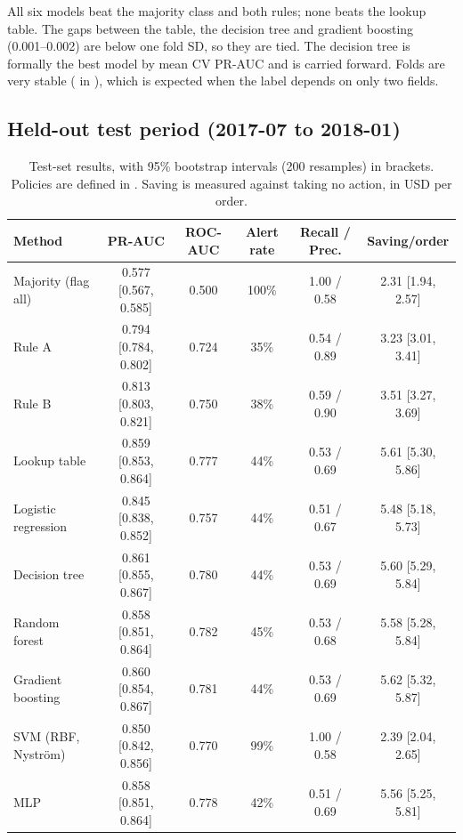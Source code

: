All six models beat the majority class and both rules; none beats the lookup table. The gaps
between the table, the decision tree and gradient boosting (0.001--0.002) are below one fold
SD, so they are tied. The decision tree is formally the best model by mean CV PR-AUC and is
carried forward. Folds are very stable ( in ), which is expected when the label depends on only two
fields.


\subsection{Held-out test period (2017-07 to 2018-01)}
\begin{table}[!htbp]
  \centering
  \caption{Test-set results, with 95\% bootstrap intervals (200 resamples) in brackets. Policies are defined in . Saving is measured against taking no action, in USD per order.}
  \label{tab:test}
  \footnotesize
  \setlength{\tabcolsep}{2.5pt}
  \begin{tabular}{l c c c c c}
    \toprule
    \textbf{Method} & \textbf{PR-AUC} & \textbf{ROC-AUC} & \textbf{Alert rate} & \textbf{Recall / Prec.} & \textbf{Saving/order} \\
    \midrule
    Majority (flag all)  & 0.577 [0.567, 0.585] & 0.500 & 100\% & 1.00 / 0.58 & 2.31 [1.94, 2.57] \\
    Rule A               & 0.794 [0.784, 0.802] & 0.724 & 35\%  & 0.54 / 0.89 & 3.23 [3.01, 3.41] \\
    Rule B               & 0.813 [0.803, 0.821] & 0.750 & 38\%  & 0.59 / 0.90 & 3.51 [3.27, 3.69] \\
    Lookup table         & 0.859 [0.853, 0.864] & 0.777 & 44\%  & 0.53 / 0.69 & 5.61 [5.30, 5.86] \\
    \midrule
    Logistic regression  & 0.845 [0.838, 0.852] & 0.757 & 44\%  & 0.51 / 0.67 & 5.48 [5.18, 5.73] \\
    Decision tree        & 0.861 [0.855, 0.867] & 0.780 & 44\%  & 0.53 / 0.69 & 5.60 [5.29, 5.84] \\
    Random forest        & 0.858 [0.851, 0.864] & 0.782 & 45\%  & 0.53 / 0.68 & 5.58 [5.28, 5.84] \\
    Gradient boosting    & 0.860 [0.854, 0.867] & 0.781 & 44\%  & 0.53 / 0.69 & 5.62 [5.32, 5.87] \\
    SVM (RBF, Nystr\"om) & 0.850 [0.842, 0.856] & 0.770 & 99\%  & 1.00 / 0.58 & 2.39 [2.04, 2.65] \\
    MLP                  & 0.858 [0.851, 0.864] & 0.778 & 42\%  & 0.51 / 0.69 & 5.56 [5.25, 5.81] \\
    \bottomrule
  \end{tabular}
\end{table}

